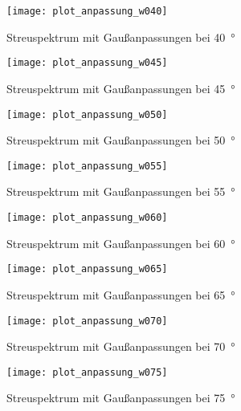 \documentclass[11pt, ngerman, fleqn, DIV=15, headinclude, BCOR=2cm]{scrreprt}
\begin{document}
\begin{appendix}
\begin{figure}[h]
    \centering
    \texttt{[image: plot\_anpassung\_w040]}
    \caption{%
	    Streuspektrum mit Gaußanpassungen bei \SI{40}{\degree}
    }
    \label{fig:plot_anpassung_w040}
\end{figure}

\begin{figure}[h]
    \centering
    \texttt{[image: plot\_anpassung\_w045]}
    \caption{%
	    Streuspektrum mit Gaußanpassungen bei \SI{45}{\degree}
    }
    \label{fig:plot_anpassung_w045}
\end{figure}

\begin{figure}[h]
    \centering
    \texttt{[image: plot\_anpassung\_w050]}
    \caption{%
	    Streuspektrum mit Gaußanpassungen bei \SI{50}{\degree}
    }
    \label{fig:plot_anpassung_w050}
\end{figure}

\begin{figure}[h]
    \centering
    \texttt{[image: plot\_anpassung\_w055]}
    \caption{%
	    Streuspektrum mit Gaußanpassungen bei \SI{55}{\degree}
    }
    \label{fig:plot_anpassung_w055}
\end{figure}

\begin{figure}[h]
    \centering
    \texttt{[image: plot\_anpassung\_w060]}
    \caption{%
	    Streuspektrum mit Gaußanpassungen bei \SI{60}{\degree}
    }
    \label{fig:plot_anpassung_w060}
\end{figure}

\begin{figure}[h]
    \centering
    \texttt{[image: plot\_anpassung\_w065]}
    \caption{%
	    Streuspektrum mit Gaußanpassungen bei \SI{65}{\degree}
    }
    \label{fig:plot_anpassung_w065}
\end{figure}

\begin{figure}[h]
    \centering
    \texttt{[image: plot\_anpassung\_w070]}
    \caption{%
	    Streuspektrum mit Gaußanpassungen bei \SI{70}{\degree}
    }
    \label{fig:plot_anpassung_w070}
\end{figure}

\begin{figure}[h]
    \centering
    \texttt{[image: plot\_anpassung\_w075]}
    \caption{%
	    Streuspektrum mit Gaußanpassungen bei \SI{75}{\degree}
    }
    \label{fig:plot_anpassung_w075}
\end{figure}


\end{appendix}
\end{document}
